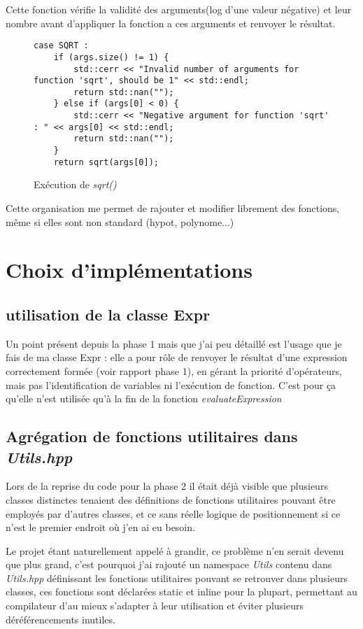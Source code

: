 \documentclass[]{article}
\begin{document}
Cette fonction vérifie la validité des arguments(log d'une valeur négative) et leur nombre avant d'appliquer la fonction a ces arguments et renvoyer le résultat.

\begin{figure}[h]
\centering
\begin{lstlisting}
case SQRT :
	if (args.size() != 1) {
		std::cerr << "Invalid number of arguments for function 'sqrt', should be 1" << std::endl;
		return std::nan("");
	} else if (args[0] < 0) {
		std::cerr << "Negative argument for function 'sqrt' : " << args[0] << std::endl;
		return std::nan("");
	}
	return sqrt(args[0]);
\end{lstlisting}
\caption{Exécution de \textit{sqrt()}}
\end{figure}

Cette organisation me permet de rajouter et modifier librement des fonctions, même si elles sont non standard (hypot, polynome...)  

\section{Choix d'implémentations}
\subsection{utilisation de la classe Expr}
Un point présent depuis la phase 1 mais que j'ai peu détaillé est l'usage que je fais de ma classe Expr : elle a pour rôle de renvoyer le résultat d'une expression correctement formée (voir rapport phase 1),  en gérant la priorité d'opérateurs, mais pas l'identification de variables ni l'exécution de fonction.
C'est pour ça qu'elle n'est utilisée qu'à la fin de la fonction \textit{evaluateExpression}

\subsection{Agrégation de fonctions utilitaires dans \textit{Utils.hpp}} 
Lors de la reprise du code pour la phase 2 il était déjà visible que plusieurs classes distinctes tenaient des définitions de fonctions utilitaires pouvant être employés par d'autres classes, et ce sans réelle logique de positionnement si ce n'est le premier endroit où j'en ai eu besoin.

Le projet étant naturellement appelé à grandir, ce problème n'en serait devenu que plus grand, c'est pourquoi j'ai rajouté un namespace \textit{Utils} contenu dans \textit{Utils.hpp} définissant les fonctions utilitaires pouvant se retrouver dans plusieurs classes, ces fonctions sont déclarées static et inline pour la plupart, permettant au compilateur d'au mieux s'adapter à leur utilisation et éviter plusieurs déréférencements inutiles.
\end{document}
